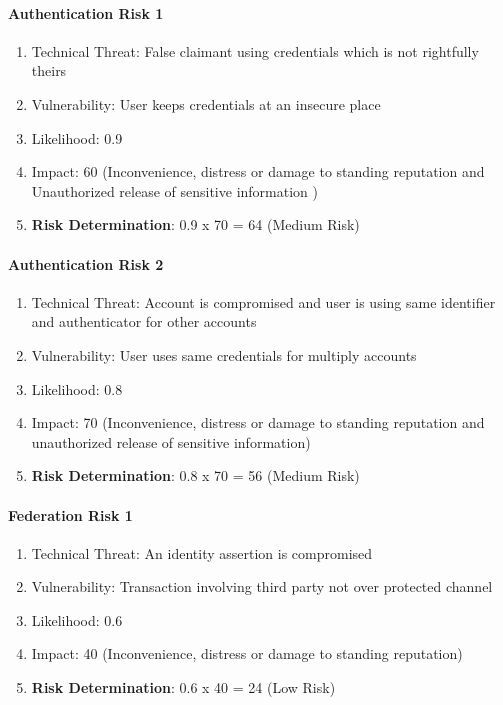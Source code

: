 \paragraph{Authentication Risk 1}
\begin{enumerate}
	\item Technical Threat: False claimant using credentials which is not rightfully theirs
	\item Vulnerability: User keeps credentials at an insecure place
	\item Likelihood: 0.9
	\item Impact: 60 (Inconvenience, distress or damage to standing reputation and Unauthorized release of sensitive information )
	\item \textbf{Risk Determination}: 0.9 x 70 = 64 (Medium Risk) 
\end{enumerate}

\paragraph{Authentication Risk 2}
\begin{enumerate}
	\item Technical Threat: Account is compromised and user is using same identifier and authenticator for other accounts
	\item Vulnerability: User uses same credentials for multiply accounts
	\item Likelihood: 0.8
	\item Impact: 70 (Inconvenience, distress or damage to standing reputation and unauthorized release of sensitive information)
	\item \textbf{Risk Determination}: 0.8 x 70 = 56 (Medium Risk)
\end{enumerate}
\pagebreak[4]
\paragraph{Federation Risk 1 }
\begin{enumerate}
	\item Technical Threat: An identity assertion is compromised
	\item Vulnerability: Transaction involving third party not over protected channel
	\item Likelihood: 0.6
	\item Impact: 40 (Inconvenience, distress or damage to standing reputation)
	\item \textbf{Risk Determination}: 0.6 x 40 = 24 (Low Risk)
\end{enumerate}

